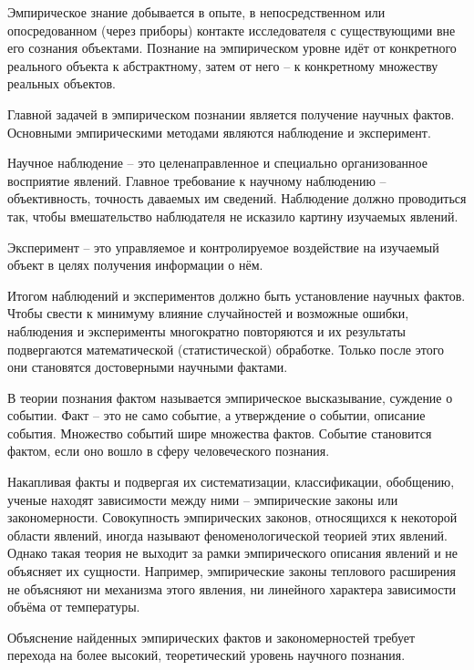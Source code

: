 \documentclass[exam_answers.tex]{subfiles}
\begin{document}
\renewcommand{\baselinestretch}{0.75}

Эмпирическое знание добывается в опыте, в непосредственном или опосредованном (через приборы) контакте исследователя с существующими вне его сознания объектами.
Познание на эмпирическом уровне идёт от конкретного реального объекта к абстрактному, затем от него – к конкретному множеству реальных объектов.

Главной задачей в эмпирическом познании является получение научных фактов.
Основными эмпирическими методами являются наблюдение и эксперимент.

Научное наблюдение – это целенаправленное и специально организованное восприятие явлений.
Главное требование к научному наблюдению – объективность, точность даваемых им сведений.
Наблюдение должно проводиться так, чтобы вмешательство наблюдателя не исказило картину изучаемых явлений.

Эксперимент – это управляемое и контролируемое воздействие на изучаемый объект в целях получения информации о нём.

Итогом наблюдений и экспериментов должно быть установление научных фактов.
Чтобы свести к минимуму влияние случайностей и возможные ошибки, наблюдения и эксперименты многократно повторяются и их результаты подвергаются математической (статистической) обработке.
Только после этого они становятся достоверными научными фактами.

В теории познания фактом называется эмпирическое высказывание, суждение о событии. 
Факт – это не само событие, а утверждение о событии, описание события.
Множество событий шире множества фактов.
Событие становится фактом, если оно вошло в сферу человеческого познания.

Накапливая факты и подвергая их систематизации, классификации, обобщению, ученые находят зависимости между ними – эмпирические законы или закономерности.
Совокупность эмпирических законов, относящихся к некоторой области явлений, иногда называют феноменологической теорией этих явлений.
Однако такая теория не выходит за рамки эмпирического описания явлений и не объясняет их сущности.
Например, эмпирические законы теплового расширения не объясняют ни механизма этого явления, ни линейного характера зависимости объёма от температуры.

Объяснение найденных эмпирических фактов и закономерностей требует перехода на более высокий, теоретический уровень научного познания.
\end{document}
